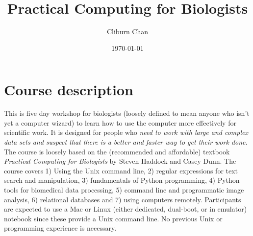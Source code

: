\documentclass[11pt,letter]{article}
\title{}
\title{Practical Computing for Biologists}
\author{Cliburn Chan}
\date{\today}
\begin{document}
\maketitle


\section{Course description}
\label{sec-1}

This is five day workshop for biologists (loosely defined to mean anyone who isn't yet a computer wizard) to learn how to use the computer more effectively for scientific work. It is designed for people who \emph{need to work with large and complex data sets and suspect that there is a better and faster way to get their work done}. The course is loosely based on the (recommended and affordable) textbook \emph{Practical Computing for Biologists} by Steven Haddock and Casey Dunn. The course covers 1) Using the Unix command line, 2) regular expressions for text search and manipulation, 3) fundamentals of Python programming, 4) Python tools for biomedical data processing, 5) command line and programmatic image analysis, 6) relational databases and 7) using computers remotely. Participants are expected to use a Mac or Linux (either dedicated, dual-boot, or in emulator) notebook since these provide a Unix command line. No previous Unix or programming experience is necessary.
\end{document}
